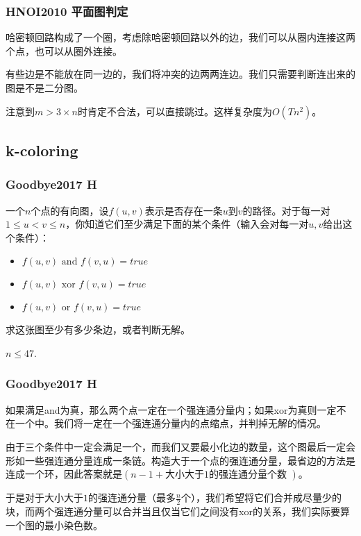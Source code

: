 \documentclass[10pt]{beamer}
\begin{document}
\begin{CJK}{UTF8}{gkai}
\begin{spacing}{1.1}
\begin{frame}
\frametitle{HNOI2010 平面图判定}

	哈密顿回路构成了一个圈，考虑除哈密顿回路以外的边，我们可以从圈内连接这两个点，也可以从圈外连接。\pause

	有些边是不能放在同一边的，我们将冲突的边两两连边。我们只需要判断连出来的图是不是二分图。\pause

	注意到$m > 3 \times n$时肯定不合法，可以直接跳过。这样复杂度为$O(Tn^2)$。
	
\end{frame}

\subsection{k-coloring}
\begin{frame}
\frametitle{Goodbye2017 H}

	一个$n$个点的有向图，设$f(u, v)$表示是否存在一条$u$到$v$的路径。对于每一对$1 \le u < v \le n$，你知道它们至少满足下面的某个条件（输入会对每一对$u, v$给出这个条件）：

	\begin{itemize}
		\item $f(u, v) \text{ and } f(v, u) = true$
		\item $f(u, v) \text{ xor } f(v, u) = true$
		\item $f(u, v) \text{ or } f(v, u) = true$
	\end{itemize}

	求这张图至少有多少条边，或者判断无解。

	$n \le 47$.

\end{frame}

\begin{frame}
\frametitle{Goodbye2017 H}

	如果满足and为真，那么两个点一定在一个强连通分量内；如果xor为真则一定不在一个中。我们将一定在一个强连通分量内的点缩点，并判掉无解的情况。\pause

	由于三个条件中一定会满足一个，而我们又要最小化边的数量，这个图最后一定会形如一些强连通分量连成一条链。构造大于一个点的强连通分量，最省边的方法是连成一个环，因此答案就是$(n - 1 + \text{大小大于1的强连通分量个数 })$。\pause

	于是对于大小大于$1$的强连通分量（最多$\frac n2$个），我们希望将它们合并成尽量少的块，而两个强连通分量可以合并当且仅当它们之间没有xor的关系，我们实际要算一个图的最小染色数。

\end{frame}


\end{spacing}
\end{CJK}
\end{document}
